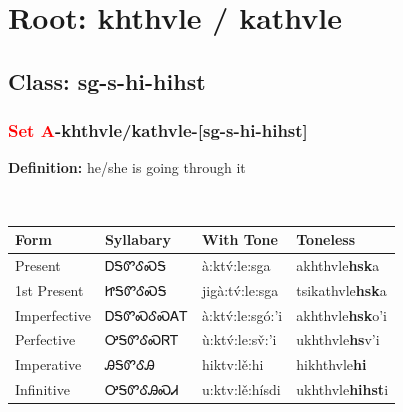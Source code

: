 \needspace{4in}
\section*{Root: khthvle / kathvle}
\nopagebreak
{}
\needspace{3in}
\subsection*{Class: sg-s-hi-hihst}
\nopagebreak
\needspace{2in}
\subsubsection*{\textcolor{Red}{Set A}{-}\textbf{khthvle/kathvle}{-}[sg-s-hi-hihst]}
\nopagebreak
\textbf{Definition: } he/she is going through it
\\[0.5em]
\begin{tabularx}{\textwidth}{l X X X}%
\toprule%
\textbf{Form}&\textbf{Syllabary}&\textbf{With Tone}&\textbf{Toneless}\\%
\midrule%
Present&ᎠᎦᏛᎴᏍᎦ&à:ktv́:le:sga&akhthvle\textbf{hsk}a\\%
1st Present&ᏥᎦᏛᎴᏍᎦ&jigà:tv́:le:sga&tsikathvle\textbf{hsk}a\\%
Imperfective&ᎠᎦᏛᏍᎴᏍᎪᎢ&à:ktv́:le:sgó:’i&akhthvle\textbf{hsk}o'i\\%
Perfective&ᎤᎦᏛᎴᏍᏒᎢ&ù:ktv́:le:sv̌:’i&ukhthvle\textbf{hs}v'i\\%
Imperative&ᎯᎦᏛᎴᎯ&hiktv:lě:hi&hikhthvle\textbf{hi}\\%
Infinitive&ᎤᎦᏛᎴᎯᏍᏗ&u:ktv:lě:hísdi&ukhthvle\textbf{hihst}i\\%
\bottomrule%
\end{tabularx}
\\[1em]